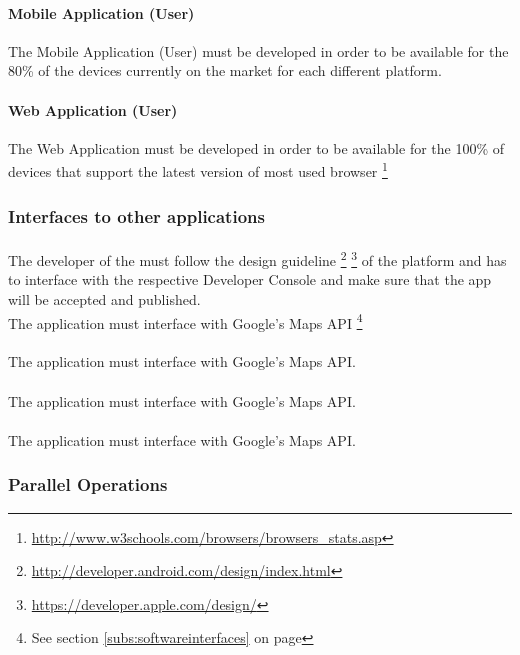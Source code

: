 \paragraph{Mobile Application (User)} 
The Mobile Application (User) must be developed in order to be available for the 80\% of the devices currently on the market for each different platform.
\paragraph{Web Application (User)}
The Web Application must be developed in order to be available for the 100\% of devices that support the latest version of most used browser \footnote {\url{http://www.w3schools.com/browsers/browsers_stats.asp}}


\subsubsection{Interfaces to other applications} 
\label{ssub:interfaces_to_other_applications}
\paragraph{} 
The developer of the \textbf{} must follow the design guideline \footnote{\url{http://developer.android.com/design/index.html}} \footnote{\url{https://developer.apple.com/design/}} of the platform and has to interface with the respective Developer Console and make sure that the app will be accepted and published. \\
The application must interface with Google's Maps API \footnote{See section \ref{subs:softwareinterfaces} on page \pageref{subs:softwareinterfaces}}
\paragraph{} 
The application must interface with Google's Maps API.
\paragraph{} 
The application must interface with Google's Maps API.
\paragraph{} 
The application must interface with Google's Maps API.

\subsubsection{Parallel Operations} 
\label{ssub:parrallel_operations}
